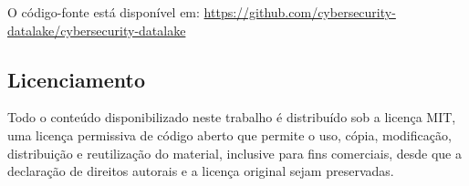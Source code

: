 O código-fonte está disponível em:
\url{https://github.com/cybersecurity-datalake/cybersecurity-datalake}

\subsection{Licenciamento}

Todo o conteúdo disponibilizado neste trabalho é distribuído sob a licença MIT, uma licença permissiva de código aberto que permite o uso, cópia, modificação, distribuição e reutilização do material, inclusive para fins comerciais, desde que a declaração de direitos autorais e a licença original sejam preservadas.
